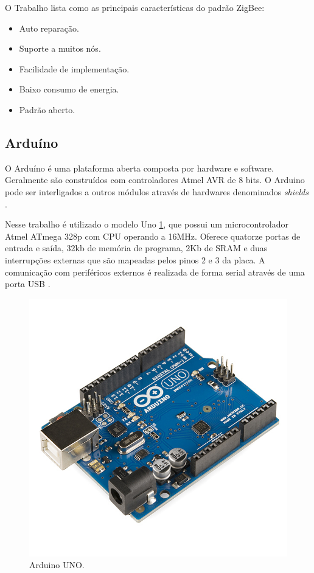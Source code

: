O Trabalho \cite{Ramya:2011} lista como as principais características do padrão ZigBee:


\begin{itemize}
  \item Auto reparação.
  \item Suporte a muitos nós.
  \item Facilidade de implementação.
  \item Baixo consumo de energia.
  \item Padrão aberto.
\end{itemize}

\subsection{Arduíno}

O Arduíno é uma plataforma aberta composta por hardware e software. Geralmente são construídos com controladores Atmel AVR de 8 bits. O Arduino pode ser interligados a outros módulos através de hardwares denominados \emph{shields} \cite{Arduino:2015}.

Nesse trabalho é utilizado o modelo Uno \ref{fig:arduinoUno}, que possui um microcontrolador Atmel ATmega 328p com CPU operando a 16MHz. Oferece quatorze portas de entrada e saída, 32kb de memória de programa, 2Kb de SRAM e duas interrupções externas que são mapeadas pelos pinos 2 e 3 da placa. A comunicação com periféricos externos é realizada de forma serial através de uma porta USB \cite{Arduino:2015}.

\begin{figure}[htbp]
	\centering
		\includegraphics[scale=0.2]{referencial/figuras/arduinoUno.jpg}
	\caption{Arduino UNO.}
	\label{fig:arduinoUno}
\end{figure}

